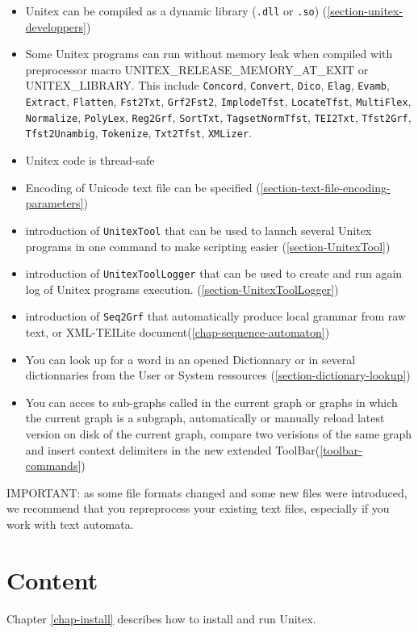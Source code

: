 \begin{itemize}
  \item Unitex can be compiled as a dynamic library (\verb$.dll$ or \verb$.so$)
  (\ref{section-unitex-developpers})
  \item Some Unitex programs can run without memory leak when compiled with preprocessor
  macro UNITEX\_RELEASE\_MEMORY\_AT\_EXIT or UNITEX\_LIBRARY.
  This include \verb$Concord$, \verb$Convert$, \verb$Dico$, \verb$Elag$, \verb$Evamb$, \verb$Extract$, \verb$Flatten$, \verb$Fst2Txt$, \verb$Grf2Fst2$, \verb$ImplodeTfst$, \verb$LocateTfst$, \verb$MultiFlex$, \verb$Normalize$, \verb$PolyLex$, \verb$Reg2Grf$, \verb$SortTxt$, \verb$TagsetNormTfst$, \verb$TEI2Txt$, \verb$Tfst2Grf$, \verb$Tfst2Unambig$, \verb$Tokenize$, \verb$Txt2Tfst$, \verb$XMLizer$.
  \item Unitex code is thread-safe
  \item Encoding of Unicode text file can be specified (\ref{section-text-file-encoding-parameters})
  \item introduction of \verb$UnitexTool$ that can be used to launch several
  Unitex programs in one command to make scripting easier
  (\ref{section-UnitexTool})
  \item introduction of \verb$UnitexToolLogger$ that can be used to create and
  run again log of Unitex programs execution.
  (\ref{section-UnitexToolLogger})
  \item introduction of \verb$Seq2Grf$ that automatically produce local grammar from raw text,
  or XML-TEILite document(\ref{chap-sequence-automaton})
  \item You can look up for a word in an opened Dictionnary or in several dictionnaries from the User or System ressources (\ref{section-dictionary-lookup})
  \item You can acces to sub-graphs called in the current graph or graphs in which the current graph is a subgraph, automatically or manually reload latest version on disk of the current graph, compare two verisions of the same graph and insert context delimiters in the new extended ToolBar(\ref{toolbar-commands})
\end{itemize}

\bigskip
\noindent IMPORTANT: as some file formats changed and some new files were introduced, we recommend that you
repreprocess your existing text files, especially if you work with text
automata.

\section*{Content}
\noindent Chapter \ref{chap-install} describes how to install and run
Unitex.

